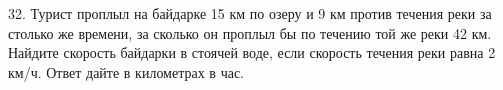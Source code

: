32. Турист проплыл на байдарке 15 км по озеру и 9 км против течения реки за столько же времени, за сколько он проплыл бы по течению той же реки 42 км. Найдите скорость байдарки в стоячей воде, если скорость течения реки равна 2 км/ч. Ответ дайте в километрах в час.\\
